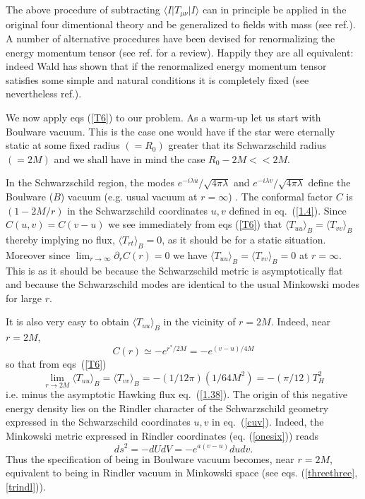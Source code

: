 \documentclass[12pt,oneside]{report}
\begin{document}
The above procedure of subtracting $\langle I \vert T_{\mu\nu} \vert I\rangle$
can in principle be applied in the original four dimentional
theory and be generalized to fields with mass (see ref.\cite{Massar}).
 A number of alternative procedures have been devised
for renormalizing the energy momentum tensor (see ref.\cite{BD} for a review).
Happily they are all equivalent: indeed Wald \cite{Wald2} has shown that if the
renormalized energy momentum tensor satisfies  some simple and natural
conditions it is completely fixed (see nevertheless ref.\cite {OttewillBrown}). 

 We now apply eqs (\ref{T6}) to our problem. As a warm-up let us start with Boulware
vacuum. This is the case one would have if the star were eternally static at
some fixed radius $ (= R_0)$ greater that its Schwarzschild radius $ (= 2M)$ and
we shall have in mind the case $ {R_0 - 2M} << 2M$.

In the Schwarzschild region, the modes $ e^{-i \lambda u}/ \sqrt{4 \pi \lambda}$
and $ e^{-i \lambda v}/ \sqrt{4 \pi \lambda}$ define the Boulware ($B$) vacuum
(e.g. usual vacuum at  $r=\infty$) . The conformal factor $C$ is  $  (1 - 2M /
r) $ in the Schwarzschild coordinates $u,v$ defined in eq.~(\ref{1.4}). Since $
C(u,v) = C(v-u) $ we see immediately from eqs (\ref{T6}) that $ \langle T_{uu}
\rangle_B = \langle T_{vv} \rangle_B $ thereby implying no flux, $ \langle
T_{rt} \rangle_B = 0 $,
 as it should be for a static situation. Moreover since $\lim_{ r \to \infty }
\partial_r C (r) = 0  $ we have $ \langle T_{uu}\rangle _{ B} = \langle T_{vv}
\rangle _{B} = 0$ at $ r = \infty $. This is  as it should  be because the
 Schwarzschild metric  is asymptotically flat and because the Schwarzschild 
modes are identical to the usual Minkowski modes for large $r$.

It is also very easy to obtain $ \langle T_{uu} \rangle_B$ in  the vicinity of $
r = 2M $. Indeed, near $ r = 2M $, \begin{equation}
 C(r) \simeq - e^{r^*/2M} = -e^{(v-u)/4M} \label{cuv} \end{equation}
 so that from eqs~(\ref{T6})  \begin{equation}
  \lim_{r \to 2M} \langle T_{uu} \rangle_B = \langle T_{vv} \rangle_B = - (1/12
\pi) (1/6 4 M^2) =- (\pi/12) T_{H}^{2} \label{minus} \end{equation} i.e. minus
the asymptotic Hawking flux eq.~(\ref{1.38}). The origin of this negative energy
density lies on the Rindler character of the Schwarzschild geometry expressed in
the Schwarzschild coordinates $u,v$ in eq.~(\ref{cuv}). Indeed, the Minkowski
metric expressed in Rindler  coordinates (eq. (\ref{onesix})) reads
\begin{equation} ds^2= -dU dV = - e^{a(v-u)} du dv. \end{equation} Thus the
specification of being in Boulware vacuum  becomes, near $r=2M$, equivalent
 to being in Rindler vacuum in Minkowski space (see eqs. (\ref{threethree},
\ref{trindl})).  
\end{document}
